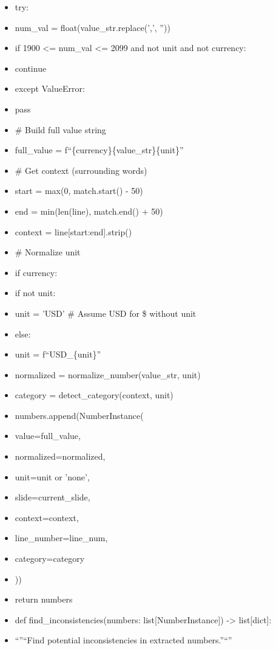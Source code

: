 \documentclass[11pt]{article}
\begin{document}
\begin{itemize}[leftmargin=*,itemsep=2pt,topsep=2pt]
\item {} try:
\item {} num\_\allowbreak{}val = float(value\_\allowbreak{}str.replace(',', ''))
\item {} if 1900 <= num\_\allowbreak{}val <= 2099 and not unit and not currency:
\item {} continue
\item {} except ValueError:
\item {} pass
\item {} \# Build full value string
\item {} full\_\allowbreak{}value = f``\{currency\}\{value\_\allowbreak{}str\}\{unit\}''
\item {} \# Get context (surrounding words)
\item {} start = max(0, match.start() - 50)
\item {} end = min(len(line), match.end() + 50)
\item {} context = line[start:end].strip()
\item {} \# Normalize unit
\item {} if currency:
\item {} if not unit:
\item {} unit = 'USD' \# Assume USD for \$ without unit
\item {} else:
\item {} unit = f``USD\_\allowbreak{}\{unit\}''
\item {} normalized = normalize\_\allowbreak{}number(value\_\allowbreak{}str, unit)
\item {} category = detect\_\allowbreak{}category(context, unit)
\item {} numbers.append(NumberInstance(
\item {} value=full\_\allowbreak{}value,
\item {} normalized=normalized,
\item {} unit=unit or 'none',
\item {} slide=current\_\allowbreak{}slide,
\item {} context=context,
\item {} line\_\allowbreak{}number=line\_\allowbreak{}num,
\item {} category=category
\item {} ))
\item {} return numbers
\item {} def find\_\allowbreak{}inconsistencies(numbers: list[NumberInstance]) -> list[dict]:
\item {} ``''``Find potential inconsistencies in extracted numbers.''``''

\end{itemize}
\end{document}
